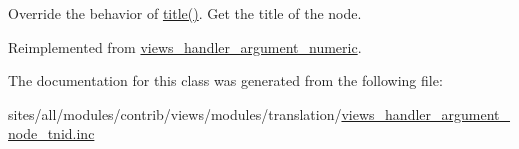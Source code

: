 Override the behavior of \hyperlink{classviews__handler__argument__numeric_480758dbcde899b5483b091e51e2bf39}{title()}. Get the title of the node. 

Reimplemented from \hyperlink{classviews__handler__argument__numeric_5c6f566b06bad6057e92f15d82311c7b}{views\_\-handler\_\-argument\_\-numeric}.

The documentation for this class was generated from the following file:\begin{CompactItemize}
\item 
sites/all/modules/contrib/views/modules/translation/\hyperlink{views__handler__argument__node__tnid_8inc}{views\_\-handler\_\-argument\_\-node\_\-tnid.inc}\end{CompactItemize}
